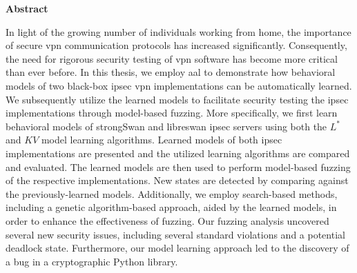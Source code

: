 

\cleardoublepage

\vspace*{2cm}

\begin{center}
{\Large\sffamily\bfseries Abstract}
\end{center}
In light of the growing number of individuals working from home, the importance of secure \ac{vpn} communication protocols has increased significantly. Consequently, the need for rigorous security testing of \ac{vpn} software has become more critical than ever before. 
In this thesis, we employ \ac{aal} to demonstrate how behavioral models of two black-box \ac{ipsec} \ac{vpn} implementations can be automatically learned. We subsequently utilize the learned models to facilitate security testing the \ac{ipsec} implementations through model-based fuzzing. 
More specifically, we first learn behavioral models of strongSwan and libreswan \ac{ipsec} servers using both the $L^*$ and $KV$ model learning algorithms. Learned models of both \ac{ipsec} implementations are presented and the utilized learning algorithms are compared and evaluated. The learned models are then used to perform model-based fuzzing of the respective implementations. New states are detected by comparing against the previously-learned models. Additionally, we employ search-based methods, including a genetic algorithm-based approach, aided by the learned models, in order to enhance the effectiveness of fuzzing. Our fuzzing analysis uncovered several new security issues, including several standard violations and a potential deadlock state. Furthermore, our model learning approach led to the discovery of a bug in a cryptographic Python library.

